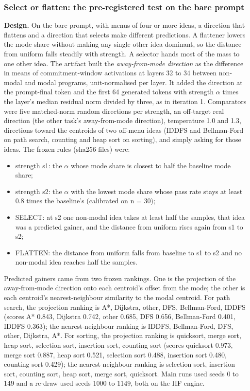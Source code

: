 \documentclass[11pt,letterpaper]{article}
\begin{document}
\subsubsection{Select or flatten: the pre-registered test on the bare prompt}
\textbf{Design.} On the bare prompt, with menus of four or more ideas, a direction that flattens and a direction that selects make different predictions. A flattener lowers the mode share without making any single other idea dominant, so the distance from uniform falls steadily with strength. A selector hands most of the mass to one other idea. The artifact built the \emph{away-from-mode direction} as the difference in means of commitment-window activations at layers 32 to 34 between non-modal and modal programs, unit-normalised per layer. It added the direction at the prompt-final token and the first 64 generated tokens with strength \ensuremath{\alpha} times the layer's median residual norm divided by three, as in iteration 1. Comparators were five matched-norm random directions per strength, an off-target real direction (the other task's away-from-mode direction), temperature 1.0 and 1.3, directions toward the centroids of two off-menu ideas (IDDFS and Bellman-Ford on path search, counting and heap sort on sorting), and simply asking for those ideas. The frozen rules (sha256 files) were:

\begin{itemize}
\item strength s1: the \ensuremath{\alpha} whose mode share is closest to half the baseline mode share;
\item strength s2: the \ensuremath{\alpha} with the lowest mode share whose pass rate stays at least 0.8 times the baseline's (calibrated on n = 30);
\item SELECT: at s2 one non-modal idea takes at least half the samples, that idea was a predicted gainer, and the distance from uniform rises again from s1 to s2;
\item FLATTEN: the distance from uniform falls from baseline to s1 to s2 and no non-modal idea reaches half the samples.
\end{itemize}
Predicted gainers came from two frozen rankings. One is the projection of the away-from-mode direction onto each centroid's offset from the mode; the other is each centroid's nearest-neighbour similarity to the modal centroid. For path search, the projection ranking is A*, Dijkstra, other, DFS, Bellman-Ford, IDDFS (scores A* 0.843, Dijkstra 0.742, other 0.685, DFS 0.656, Bellman-Ford 0.401, IDDFS 0.363); the nearest-neighbour ranking is IDDFS, Bellman-Ford, DFS, other, Dijkstra, A*. For sorting, the projection ranking is quicksort, merge sort, heap sort, selection sort, insertion sort, counting sort (scores quicksort 0.973, merge sort 0.887, heap sort 0.521, selection sort 0.488, insertion sort 0.480, counting sort 0.429); the nearest-neighbour ranking is selection sort, insertion sort, counting sort, heap sort, merge sort, quicksort. Main runs used seeds 0 to 149 and a re-draw used seeds 1000 to 1149, both on the HF engine.
\end{document}
